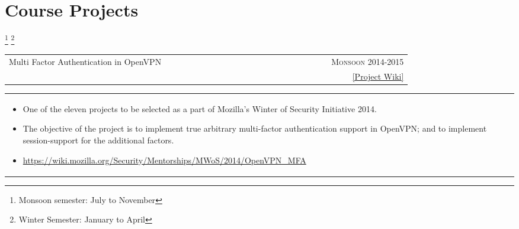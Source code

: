 \documentclass[a4paper,10pt]{article} %
\newcommand{\cproject}[5]{
    \begin{tabular}{p{0.80\linewidth}r}
        \textcolor{NavyBlue}{#2} & \multicolumn{1}{m{4cm}}{\raggedleft \textsc{#1}}\\
        #3 & #4
    \end{tabular}
    \begin{tabular}{p{\linewidth}}
    \vspace{-0.3cm}
        \footnotesize{#5}
    \end{tabular}
    \vspace{-0.5cm}
}
\begin{document}
 \section{Course Projects}
 \let\thefootnote\relax\footnote{Monsoon semester: July to November}
 \let\thefootnote\relax\footnote{Winter Semester: January to April}

\cproject
    {Monsoon 2014-2015}
    {Multi Factor Authentication in OpenVPN}
    {\textsc{\raggedright Mozilla Winter of Security}, Guillaume Destuynder and Professor Dheeraj Sanghi}
    {\href{https://wiki.mozilla.org/Security/Mentorships/MWoS/2014/OpenVPN\_MFA}{ \footnotesize{[Project Wiki]}} }
          {
              \begin{itemize}[leftmargin=0.5cm]
                  \item One of the eleven projects to be selected as a part of Mozilla's Winter of Security Initiative 2014.
                  \item The objective of the project is to implement true arbitrary multi-factor authentication support in
                      OpenVPN; and to implement session-support for the additional factors.
                  \item \href{https://wiki.mozilla.org/Security/Mentorships/MWoS/2014/OpenVPN\_MFA}%
                      {https://wiki.mozilla.org/Security/Mentorships/MWoS/2014/OpenVPN\_MFA}
              \end{itemize}
          }
\end{document}
